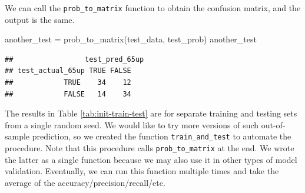 \documentclass[
]{article}
\newenvironment{Shaded}{\begin{snugshade}}{\end{snugshade}}
\newcommand{\AttributeTok}[1]{\textcolor[rgb]{0.77,0.63,0.00}{#1}}
\newcommand{\CommentTok}[1]{\textcolor[rgb]{0.56,0.35,0.01}{\textit{#1}}}
\newcommand{\ControlFlowTok}[1]{\textcolor[rgb]{0.13,0.29,0.53}{\textbf{#1}}}
\newcommand{\DecValTok}[1]{\textcolor[rgb]{0.00,0.00,0.81}{#1}}
\newcommand{\FloatTok}[1]{\textcolor[rgb]{0.00,0.00,0.81}{#1}}
\newcommand{\FunctionTok}[1]{\textcolor[rgb]{0.00,0.00,0.00}{#1}}
\newcommand{\NormalTok}[1]{#1}
\newcommand{\OtherTok}[1]{\textcolor[rgb]{0.56,0.35,0.01}{#1}}
\newcommand{\SpecialCharTok}[1]{\textcolor[rgb]{0.00,0.00,0.00}{#1}}
\begin{document}
\begin{Shaded}
\end{Shaded}

We can call the \texttt{prob\_to\_matrix} function to obtain the
confusion matrix, and the output is the same.

\begin{Shaded}
\begin{Highlighting}[]
\NormalTok{another\_test }\OtherTok{=} \FunctionTok{prob\_to\_matrix}\NormalTok{(test\_data, test\_prob)}
\NormalTok{another\_test}
\end{Highlighting}
\end{Shaded}

\begin{verbatim}
##                 test_pred_65up
## test_actual_65up TRUE FALSE
##            TRUE    34    12
##            FALSE   14    34
\end{verbatim}

The results in Table \ref{tab:init-train-test} are for separate training
and testing sets from a single random seed. We would like to try more
versions of such out-of-sample prediction, so we created the function
\texttt{train\_and\_test} to automate the procedure. Note that this
procedure calls \texttt{prob\_to\_matrix} at the end. We wrote the
latter as a single function because we may also use it in other types of
model validation. Eventually, we can run this function multiple times
and take the average of the accuracy/precision/recall/etc.
\end{document}
